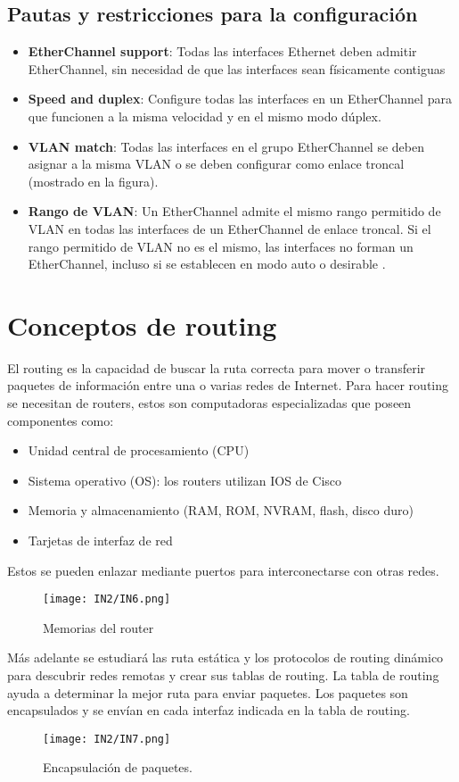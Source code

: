 \documentclass[
	12pt, %
	fleqn, %
	a4paper, %
	oneside, %
]{LegrandOrangeBook}
\begin{document}
\subsection{Pautas y restricciones para la configuración}
\begin{itemize}
\item \textbf{EtherChannel support}: Todas las interfaces Ethernet deben admitir EtherChannel,
sin necesidad de que las interfaces sean físicamente contiguas
\item \textbf{Speed and duplex}: Configure todas las interfaces en un EtherChannel para que  funcionen a la misma velocidad y en el mismo modo dúplex.
\item \textbf{VLAN match}: Todas las interfaces en el grupo EtherChannel se deben asignar a la  misma VLAN o se deben configurar como enlace troncal (mostrado en la figura).
\item \textbf{Rango de VLAN}: Un EtherChannel admite el mismo rango permitido de VLAN en  todas las interfaces de un EtherChannel de enlace troncal. Si el rango permitido de  VLAN no es el mismo, las interfaces no forman un EtherChannel, incluso si se  establecen en modo auto o desirable .
\end{itemize}
\section{Conceptos de routing}
El routing es la capacidad de buscar la ruta correcta para mover o transferir paquetes de información entre una o varias redes de Internet. Para hacer routing se necesitan de routers, estos son computadoras especializadas que poseen componentes como:
\begin{itemize}
\item Unidad central de procesamiento (CPU)
\item Sistema operativo (OS): los routers utilizan IOS de Cisco
\item Memoria y almacenamiento (RAM, ROM, NVRAM, flash, disco duro)
\item Tarjetas de interfaz de red
\end{itemize}
Estos se pueden enlazar mediante puertos para interconectarse con otras redes.
\begin{figure}[H]
\centering
\texttt{[image: IN2/IN6.png]}
\caption{Memorias del router}
\end{figure}
Más adelante se estudiará las ruta estática y los protocolos de routing dinámico para descubrir redes remotas y crear sus tablas de routing. La tabla de routing ayuda a determinar la mejor ruta para enviar paquetes. Los paquetes son encapsulados y se envían en cada interfaz indicada en la tabla de routing.
\begin{figure}
\centering
\texttt{[image: IN2/IN7.png]}
\caption{Encapsulación de paquetes.}
\end{figure}
\end{document}
